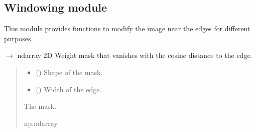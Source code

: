 \documentclass[letterpaper,10pt,english]{sphinxmanual}
\begin{document}
\sphinxstepscope


\subsection{Windowing module}
\label{\detokenize{source/Windowing:module-Windowing}}\label{\detokenize{source/Windowing:windowing-module}}\label{\detokenize{source/Windowing::doc}}
\sphinxAtStartPar
This module provides functions to modify the image near the edges for different purposes.

\begin{fulllineitems}
\label{\detokenize{source/Windowing:Windowing.make_mask_cosine_edge2d}}
\pysigstartsignatures
\pysiglinewithargsret
{}
{\sphinxparamcomma {}}
{{ $\rightarrow$ ndarray}}
\pysigstopsignatures
\sphinxAtStartPar
2D Weight mask that vanishes with the cosine distance to the edge.
\begin{quote}\begin{description}
\begin{itemize}
\item {} 
\sphinxAtStartPar
{} (\sphinxstyleliteralemphasis{\sphinxupquote{{[}}}\sphinxstyleliteralemphasis{\sphinxupquote{, }}\sphinxstyleliteralemphasis{\sphinxupquote{{]}}}) \textendash{} Shape of the mask.

\item {} 
\sphinxAtStartPar
{} () \textendash{} Width of the edge.

\end{itemize}

\sphinxAtStartPar
The mask.

\sphinxAtStartPar
np.ndarray

\end{description}\end{quote}

\end{fulllineitems}
\end{document}
